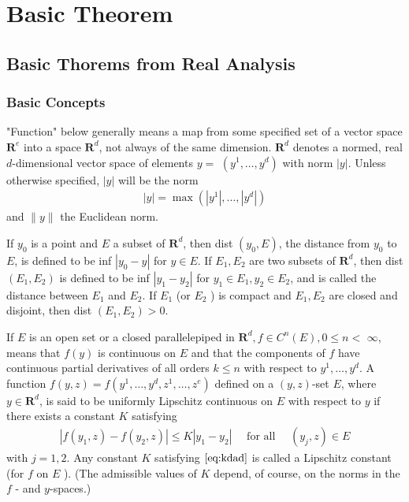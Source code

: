 \documentclass{article}
\begin{document}
\section{Basic Theorem}
\subsection{Basic Thorems from Real Analysis}
\subsubsection{Basic Concepts}
"Function" below generally means a map from some specified set of a vector space $\mathbf{R}^{e}$ into a space $\mathbf{R}^{d}$, not always of the same dimension. $\mathbf{R}^{d}$ denotes a normed, real $d$-dimensional vector space of elements $y=$ $\left(y^{1}, \ldots, y^{d}\right)$ with norm $|y|$. Unless otherwise specified, $|y|$ will be the norm
\begin{align*}
|y|=\max \left(\left|y^{1}\right|, \ldots,\left|y^{d}\right|\right)
\end{align*}
and $\|y\|$ the Euclidean norm.


If $y_{0}$ is a point and $E$ a subset of $\mathbf{R}^{d}$, then dist $\left(y_{0}, E\right)$, the distance from $y_{0}$ to $E$, is defined to be inf $\left|y_{0}-y\right|$ for $y \in E$. If $E_{1}, E_{2}$ are two subsets of $\mathbf{R}^{d}$, then dist $\left(E_{1}, E_{2}\right)$ is defined to be inf $\left|y_{1}-y_{2}\right|$ for $y_{1} \in E_{1}, y_{2} \in E_{2}$, and is called the distance between $E_{1}$ and $E_{2}$. If $E_{1}$ (or $E_{2}$ ) is compact and $E_{1}, E_{2}$ are closed and disjoint, then dist $\left(E_{1}, E_{2}\right)>0$.

If $E$ is an open set or a closed parallelepiped in $\mathbf{R}^{d}, f \in C^{n}(E), 0 \le n<$ $\infty$, means that $f(y)$ is continuous on $E$ and that the components of $f$ have continuous partial derivatives of all orders $k \le n$ with respect to $y^{1}, \ldots, y^{d} .$
A function $f(y, z)=f\left(y^{1}, \ldots, y^{d}, z^{1}, \ldots, z^{e}\right)$ defined on a $(y, z)$-set $E$, where $y \in \mathbf{R}^{d}$, is said to be uniformly Lipschitz continuous on $E$ with respect to $y$ if there exists a constant $K$ satisfying
\begin{align*}
\left|f\left(y_{1}, z\right)-f\left(y_{2}, z\right)\right| \le K\left|y_{1}-y_{2}\right| \quad \text { for all } \quad\left(y_{j}, z\right) \in E
\end{align*}
with $j=1,2 .$ Any constant $K$ satisfying $\cref{eq:kdad}$ is called a Lipschitz constant (for $f$ on $E$ ). (The admissible values of $K$ depend, of course, on the norms in the $f$ - and $y$-spaces.)
\end{document}
